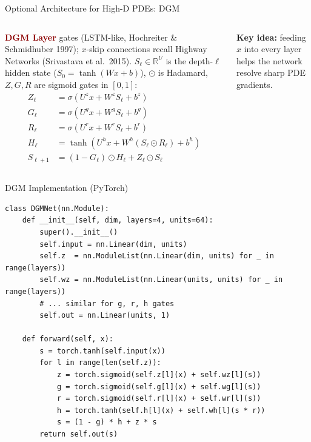 \documentclass[aspectratio=169,11pt]{beamer}
\newcommand{\emphc}[1]{\textcolor{harvardcrimson}{#1}}
\newcommand{\R}{\mathbb{R}}
\begin{document}
\begin{frame}[shrink=15]{Optional Architecture for High-D PDEs: DGM}
\begin{columns}[T]
{\footnotesize \textcolor{darkred}{\textbf{DGM Layer}} \emphc{gates} (LSTM-like, Hochreiter \& Schmidhuber 1997); $x$-skip connections recall Highway Networks (Srivastava et al.\ 2015). $S_\ell\in\R^U$ is the depth-$\ell$ hidden state ($S_0=\tanh(Wx+b)$), $\odot$ is Hadamard, $Z,G,R$ are sigmoid gates in $[0,1]$:}
\vspace{-0.6em}
{\footnotesize\begin{align*}
Z_\ell &= \sigma(U^z x + W^z S_\ell + b^z)\\
G_\ell &= \sigma(U^g x + W^g S_\ell + b^g)\\
R_\ell &= \sigma(U^r x + W^r S_\ell + b^r)\\
H_\ell &= \tanh(U^h x + W^h (S_\ell \odot R_\ell) + b^h)\\
S_{\ell+1} &= (1 - G_\ell)\odot H_\ell + Z_\ell \odot S_\ell
\end{align*}}
\vspace{-1.0em}

{\footnotesize \textbf{Key idea:} feeding $x$ into every layer helps the network resolve sharp PDE gradients.}
\end{columns}
\end{frame}

\begin{frame}[fragile]{DGM Implementation (PyTorch)}
\begin{lstlisting}[basicstyle=\scriptsize\ttfamily]
class DGMNet(nn.Module):
    def __init__(self, dim, layers=4, units=64):
        super().__init__()
        self.input = nn.Linear(dim, units)
        self.z  = nn.ModuleList(nn.Linear(dim, units) for _ in range(layers))
        self.wz = nn.ModuleList(nn.Linear(units, units) for _ in range(layers))
        # ... similar for g, r, h gates
        self.out = nn.Linear(units, 1)

    def forward(self, x):
        s = torch.tanh(self.input(x))
        for l in range(len(self.z)):
            z = torch.sigmoid(self.z[l](x) + self.wz[l](s))
            g = torch.sigmoid(self.g[l](x) + self.wg[l](s))
            r = torch.sigmoid(self.r[l](x) + self.wr[l](s))
            h = torch.tanh(self.h[l](x) + self.wh[l](s * r))
            s = (1 - g) * h + z * s
        return self.out(s)
\end{lstlisting}
\end{frame}
\end{document}
